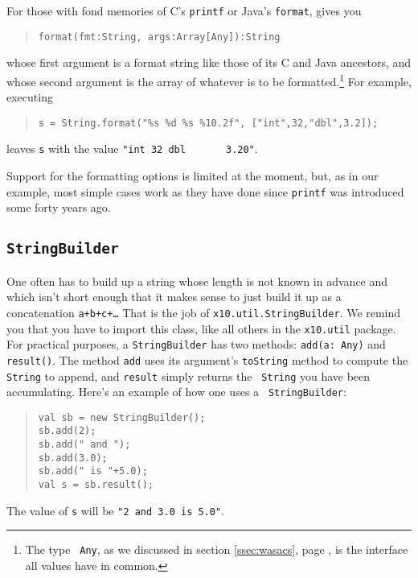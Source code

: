 For those with fond memories of C's {\tt printf} or Java's {\tt format}, \Xten{}
gives you
\begin{quote}
\begin{verbatim}
format(fmt:String, args:Array[Any]):String
\end{verbatim}
\end{quote}
whose first
argument is a format string like those of its C and Java ancestors, and whose
second argument is the array of whatever is to be formatted.\footnote{The type {\tt
Any}, as we discussed in section \ref{ssec:wasacs}, page \pageref{ssec:wasacs},
is the interface all values have in common.}  For example, executing
\begin{quote}
\begin{verbatim}
s = String.format("%s %d %s %10.2f", ["int",32,"dbl",3.2]);
\end{verbatim}
\end{quote}
leaves {\tt s} with the value {\tt "int 32 dbl\ \ \ \ \ \ \ 3.20"}.

Support for the formatting options is limited at the moment, but, as in our
example, most simple cases work as they have done since {\tt printf} was
introduced some forty years ago.

\subsection{\tt StringBuilder} One often has to build up a string whose
length is not known in advance and which isn't short enough that it makes
sense to just build it up as a concatenation {\tt a+b+c+\ldots}
That is the job of {\tt x10.util.StringBuilder}. We remind you that you have to
import this class, like all others in the {\tt x10.util} package.  For
practical purposes, a {\tt StringBuilder} has two methods: {\tt add(a: Any)} and
{\tt result()}.  The method {\tt add} uses its argument's {\tt toString} method
to compute the {\tt String} to append, and {\tt result} simply returns the {\tt
String} you have been accumulating. Here's an example of how one uses a {\tt
StringBuilder}:
\begin{quote}
\begin{verbatim}
val sb = new StringBuilder();
sb.add(2);
sb.add(" and ");
sb.add(3.0);
sb.add(" is "+5.0);
val s = sb.result();
\end{verbatim}
\end{quote}
The value of {\tt s} will be {\tt "2 and 3.0 is 5.0"}.  

